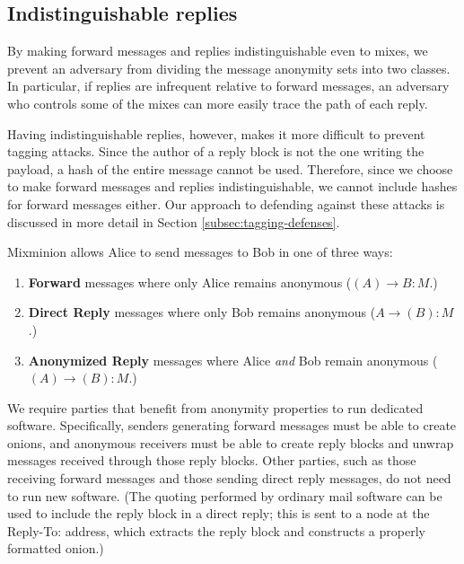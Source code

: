 \documentclass[11pt]{IEEEtran}
\begin{document}
\subsection{Indistinguishable replies}
\label{subsec:header-swap}

By making forward messages and replies indistinguishable even to mixes,
we prevent an
adversary from dividing the message anonymity sets into two classes. In
particular, if replies are infrequent relative to forward messages,
an adversary who controls some of the mixes can more easily trace the
path of each reply.

Having indistinguishable replies, however, makes it more difficult to
prevent tagging attacks.  Since the author of a reply block is not the
one writing the payload, a hash of the entire message cannot be used.
Therefore, since we choose to make forward messages and replies
indistinguishable, we cannot include hashes for forward messages either.
Our approach to defending against these attacks is discussed in more
detail in Section \ref{subsec:tagging-defenses}.

Mixminion allows Alice to send messages to Bob in one of three ways:

\begin{enumerate}
\item \textbf{Forward} messages where only Alice remains anonymous
($(A) \rightarrow B: M$.) 
\item \textbf{Direct Reply} messages where only Bob remains anonymous 
($A \rightarrow (B): M$.)
\item \textbf{Anonymized Reply} messages where Alice \emph{and} Bob
   remain anonymous ($(A) \rightarrow (B): M$.)
\end{enumerate}

We require parties that benefit from anonymity properties to run dedicated
software.  Specifically, senders generating forward messages must be able
to create onions, and anonymous receivers must be able to create reply blocks
and unwrap messages received through those reply blocks. Other parties,
such as those receiving forward messages and those sending direct reply
messages, do not need to run new software. (The quoting
performed by ordinary mail software can be used to include the reply
block in a direct reply; this is sent to a node at the Reply-To:
address, which extracts the reply block and constructs a properly
formatted onion.)
\end{document}
